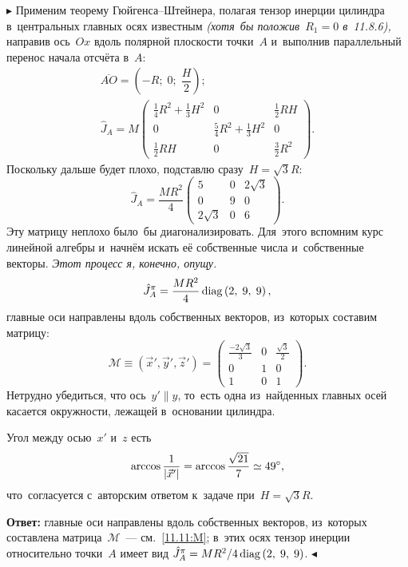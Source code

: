 \documentclass{weekly}
\begin{document}
$\blacktriangleright$ Применим теорему Гюйгенса--Штейнера,
полагая тензор инерции цилиндра в~центральных главных осях известным
\emph{(хотя~бы положив~$R_1 = 0$ в~11.8.6),} направив
ось~$Ox$ вдоль полярной плоскости точки~$A$ и~выполнив параллельный
перенос начала отсчёта в~$A$:
\begin{gather}
    \overline{AO} = \left(-R; \; 0; \; \dfrac{H}{2}\right);
\\
    \hat J_A = M
            \begin{pmatrix}
                \frac{1}{4} R^2 + \frac{1}{3} H^2 & 0 & \frac{1}{2} RH \\
                0 & \frac{5}{4} R^2 + \frac{1}{3} H^2 & 0 \\
                \frac{1}{2} RH & 0 & \frac{3}{2} R^2
            \end{pmatrix}.
\end{gather}
Поскольку дальше будет плохо, подставлю сразу~$H = \sqrt{3}R$:
\begin{equation}
    \hat J_A = \frac{MR^2}{4}
            \begin{pmatrix}
                5 & 0 & 2\sqrt{3} \\
                0 & 9 & 0 \\
                2\sqrt{3} & 0 & 6
            \end{pmatrix}.
\end{equation}
Эту матрицу неплохо было~бы диагонализировать. Для~этого вспомним
курс линейной алгебры и~начнём искать её собственные числа
и~собственные векторы. \emph{Этот процесс я, конечно, опущу.}
\begin{gather}
    \hat J_A^\pi = \frac{MR^2}{4} \operatorname{diag} \left(2, \; 9, \; 9\right),
\end{gather}
главные оси направлены вдоль собственных векторов, из~которых
составим матрицу:
\begin{equation}
    \mathcal{M} \equiv \left(\vec x', \vec y', \vec z'\right)
        = \begin{pmatrix}
            \frac{-2\sqrt{3}}{3} & 0 & \frac{\sqrt{3}}{2} \\
            0 & 1 & 0 \\
            1 & 0 & 1
        \end{pmatrix}.
    \label{11.11:M}
\end{equation}
Нетрудно убедиться, что ось~$y' \parallel y$, то~есть одна из~найденных
главных осей касается окружности, лежащей в~основании цилиндра.

Угол между осью~$x'$ и~$z$ есть
\begin{equation}
    \arccos \frac{1}{\left| \vec x' \right|} = \arccos \frac{\sqrt{21}}{7}
        \simeq 49^\circ,
\end{equation}
что~согласуется с~авторским ответом к~задаче при~$H = \sqrt{3}R$.

\textbf{Ответ:}
главные оси направлены вдоль собственных векторов, из~которых
составлена матрица~$\mathcal{M}$~--- см.~\eqref{11.11:M};
в~этих осях тензор инерции относительно точки~$A$ имеет вид
$\hat J_A^\pi = MR^2/4 \operatorname{diag} \left(2, \; 9, \; 9\right)$.
\hfill $\blacktriangleleft$
\end{document}

